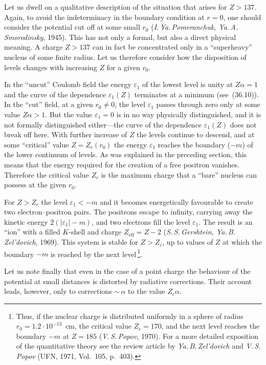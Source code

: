 Let us dwell on a qualitative description of the situation that arises for $Z > 137$. Again, to avoid the indeterminacy in the boundary condition at $r = 0$, one should consider the potential cut off at some small $r_0$ (\textit{I.\,Ya.\,Pomeranchuk, Ya.\,A.\,Smorodinsky}, 1945). This has not only a formal, but also a direct physical meaning. A charge $Z > 137$ can in fact be concentrated only in a ``superheavy'' nucleus of some finite radius. Let us therefore consider how the disposition of levels changes with increasing $Z$ for a given $r_0$.

In the ``uncut'' Coulomb field the energy $\varepsilon_1$ of the lowest level is unity at $Z\alpha = 1$ and the curve of the dependence $\varepsilon_1(Z)$ terminates at a minimum (see~(36.10)). In the ``cut'' field, at a given $r_0 \neq 0$, the level $\varepsilon_1$ passes through zero only at some value $Z\alpha > 1$. But the value $\varepsilon_1 = 0$ is in no way physically distinguished, and it is not formally distinguished either---the curve of the dependence $\varepsilon_1(Z)$ does not break off here. With further increase of $Z$ the levels continue to descend, and at some ``critical'' value $Z = Z_c(r_0)$ the energy $\varepsilon_1$ reaches the boundary ($-m$) of the lower continuum of levels. As was explained in the preceding section, this means that the energy required for the creation of a free positron vanishes. Therefore the critical value $Z_c$ is the maximum charge that a ``bare'' nucleus can possess at the given $r_0$.

For $Z > Z_c$ the level $\varepsilon_1 < -m$ and it becomes energetically favourable to create two electron--positron pairs. The positrons escape to infinity, carrying away the kinetic energy $2(|\varepsilon_1| - m)$, and two electrons fill the level $\varepsilon_1$. The result is an ``ion'' with a filled $K$-shell and charge $Z_{\mathrm{eff}} = Z - 2$ (\textit{S.\,S.\,Gershtein, Ya.\,B.\,Zel'dovich}, 1969). This system is stable for $Z > Z_c$, up to values of $Z$ at which the boundary $-m$ is reached by the next level\,\footnote{Thus, if the nuclear charge is distributed uniformly in a sphere of radius $r_0 = 1.2\cdot10^{-13}$~cm, the critical value $Z_c = 170$, and the next level reaches the boundary $-m$ at $Z = 185$ (\textit{V.\,S.\,Popov}, 1970). For a more detailed exposition of the quantitative theory see the review article by \textit{Ya.\,B.\,Zel'dovich} and \textit{V.\,S.\,Popov} (UFN, 1971, Vol.~105, p.~403).}.

Let us note finally that even in the case of a point charge the behaviour of the potential at small distances is distorted by radiative corrections. Their account leads, however, only to corrections ${\sim}\,\alpha$ to the value $Z_c\alpha$.

